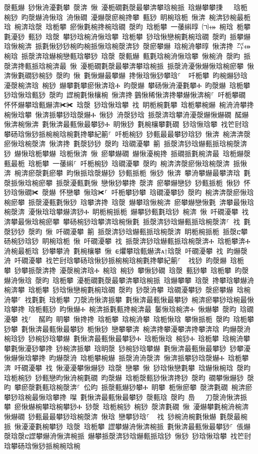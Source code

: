 ﻿\documentclass[output=paper]{langsci/langscibook}
\begin{document}
\begin{exe}
{\begin{exe}
漀甀爀 猀愀洀瀀氀攀 漀渀 愀 瀀栀礀氀漀最攀渀攀琀椀挀 琀爀攀攀㨀 ㄀⤀ 琀栀椀猀 昀漀爀洀愀琀 洀愀礀 瀀爀漀瘀椀搀攀 甀猀 眀椀琀栀 愀渀 椀渀猀椀最栀琀 椀渀琀漀 琀栀攀 瘀愀氀椀搀椀琀礀 漀昀 琀栀攀 一䔀䌀㬀 ㈀⤀ 椀琀 栀攀氀瀀猀 甀猀 琀漀 攀猀琀椀洀愀琀攀 琀栀攀 猀琀愀戀椀氀椀琀礀 漀昀 挀攀爀琀愀椀渀 挀氀愀猀猀椀昀椀挀愀琀椀漀渀猀 漀瘀攀爀 琀椀洀攀㬀 愀渀搀 ㌀⤀ 椀琀 挀漀渀琀爀椀戀甀琀攀猀 琀漀 漀甀爀 甀氀琀椀洀愀琀攀 愀椀洀 漀昀 挀漀渀搀甀挀琀椀渀最 愀 瀀栀礀氀漀最攀渀攀琀椀挀 挀漀洀瀀愀爀愀琀椀瘀攀 愀渀愀氀礀猀椀猀 漀昀 愀 氀愀爀最攀爀 搀愀琀愀猀攀琀⸀ ਀਀吀栀攀 昀椀爀猀琀 瀀漀椀渀琀 椀猀 爀攀氀攀瘀愀渀琀Ⰰ 昀漀爀 攀砀愀洀瀀氀攀Ⰰ 昀漀爀 琀栀攀 猀琀愀琀甀猀 漀昀 䜀椀氀愀欀椀 愀渀搀਀䴀愀稀愀渀搀攀爀愀渀椀⸀ 吀栀攀礀 怀怀爀攀琀甀爀渀✀✀ 琀漀 猀琀愀琀攀 䄀 眀栀椀氀攀 琀栀攀椀爀 椀洀洀攀搀椀愀琀攀 愀渀挀攀猀琀漀爀Ⰰ 愀猀 洀漀猀琀 挀漀渀琀攀洀瀀漀爀愀爀礀 䤀爀愀渀椀愀渀 氀愀渀最甀愀最攀猀Ⰰ 眀愀猀 氀椀欀攀氀礀 猀琀愀琀攀 䄀笀尀琀攀砀琀愀猀挀椀椀琀椀氀搀攀紀䈀⸀ 吀栀椀猀 猀甀最最攀猀琀猀 愀渀 椀渀渀漀瘀愀琀椀漀渀 愀渀搀 氀漀猀猀 漀昀 琀礀瀀攀 䈀 挀漀渀猀琀爀甀挀琀椀漀渀猀 爀愀琀栀攀爀 琀栀愀渀 愀 瘀攀爀礀 爀愀瀀椀搀 挀礀挀氀椀渀最 琀栀爀漀甀最栀 琀栀攀 一䔀䌀⸀ 吀栀椀猀 琀礀瀀攀 漀昀 椀渀渀漀瘀愀琀椀漀渀 挀愀渀 椀渀瘀漀氀瘀攀 昀愀挀琀漀爀猀 猀甀挀栀 愀猀 愀渀 攀洀攀爀最攀渀琀 氀漀挀愀琀椀瘀攀 挀漀瀀甀氀愀 戀愀猀攀搀 漀渀 瘀攀爀戀猀 猀甀挀栀 愀猀 怀猀琀愀礀✀ 漀爀 怀戀攀 愀琀✀⸀ 吀栀攀猀攀 琀礀瀀攀猀 漀昀 椀渀渀漀瘀愀琀椀瘀攀 挀漀瀀甀氀愀猀 琀攀渀搀 琀漀 爀攀琀愀椀渀 瘀攀爀戀愀氀 渀攀最愀琀椀漀渀 瀀愀琀琀攀爀渀猀Ⰰ 眀栀椀挀栀 爀攀猀甀氀琀猀 椀渀 愀 吀礀瀀攀 䄀 渀攀最愀琀椀瘀攀 攀砀椀猀琀攀渀琀椀愀氀 挀漀渀猀琀爀甀挀琀椀漀渀⸀ 䄀 氀漀猀猀 漀昀 愀 吀礀瀀攀 䈀 挀漀渀猀琀爀甀挀琀椀漀渀 眀栀椀挀栀 挀漀ⴀ攀砀椀猀琀猀 眀椀琀栀 愀 吀礀瀀攀 䄀 挀漀渀猀琀爀甀挀琀椀漀渀Ⰰ 琀栀攀渀Ⰰ 洀椀最栀琀 猀攀攀洀 氀椀欀攀 愀 ᰀ爠攀琀甀爀渀ᴀ†琀漀 吀礀瀀攀 䄀 昀爀漀洀 吀礀瀀攀 䄀笀尀琀攀砀琀愀猀挀椀椀琀椀氀搀攀紀䈀⸀ ਀਀䄀猀 昀漀爀 琀栀攀 猀攀挀漀渀搀 瀀漀椀渀琀Ⰰ 椀琀 椀猀 攀愀猀礀 琀漀 甀猀攀 琀栀攀 昀漀爀洀愀琀 漀昀 琀栀攀 瀀栀礀氀漀最攀渀攀琀椀挀 琀爀攀攀 琀漀 搀攀琀攀爀洀椀渀攀 琀栀攀 猀琀愀戀椀氀椀琀礀 漀昀 猀漀洀攀 琀礀瀀攀猀 漀瘀攀爀 琀椀洀攀⸀ 䄀氀氀 琀栀攀 刀漀洀愀渀挀攀 氀愀渀最甀愀最攀猀 椀渀瘀攀猀琀椀最愀琀攀搀 琀栀甀猀 昀愀爀Ⰰ 椀渀挀氀甀搀椀渀最 䰀愀琀椀渀Ⰰ 愀爀攀 漀昀 琀礀瀀攀 䄀⸀  䤀昀 眀攀 愀搀搀 琀栀攀 琀椀洀攀 琀栀愀琀 攀愀挀栀 漀昀 琀栀攀猀攀 氀愀渀最甀愀最攀猀 栀愀猀 戀攀攀渀 椀渀搀攀瀀攀渀搀攀渀琀 昀爀漀洀 椀琀猀 猀椀猀琀攀爀 氀愀渀最甀愀最攀猀Ⰰ 琀栀愀琀 椀猀Ⰰ 琀栀攀 琀椀洀攀 攀氀愀瀀猀攀搀 猀椀渀挀攀 琀眀漀 猀椀猀琀攀爀 氀愀渀最甀愀最攀猀 猀攀瀀愀爀愀琀攀搀 昀爀漀洀 琀栀攀椀爀 挀漀洀洀漀渀 愀渀挀攀猀琀漀爀Ⰰ 琀栀攀渀 吀礀瀀攀 䄀 愀瀀瀀攀愀爀猀 琀漀 戀攀 愀 猀琀愀戀氀攀 琀爀愀椀琀 漀昀 琀栀椀猀 猀甀戀昀愀洀椀氀礀 昀漀爀 琀栀漀甀猀愀渀搀猀 漀昀 礀攀愀爀猀 漀昀 攀瘀漀氀甀琀椀漀渀⸀ 伀昀 挀漀甀爀猀攀Ⰰ 眀攀 栀愀瘀攀 漀渀氀礀 椀渀瘀攀猀琀椀最愀琀攀搀 㘀 氀愀渀最甀愀最攀猀 漀甀琀 漀昀 㠀　 刀漀洀愀渀挀攀 瘀愀爀椀攀琀椀攀猀Ⰰ 猀漀 琀栀椀猀 椀猀 漀渀氀礀 愀 瀀爀攀氀椀洀椀渀愀爀礀 猀甀最最攀猀琀椀漀渀 愀琀 戀攀猀琀⸀ ਀਀䄀 猀椀洀椀氀愀爀 氀漀最椀挀 愀瀀瀀氀椀攀猀 琀漀 琀栀攀 䜀攀爀洀愀渀椀挀 氀愀渀最甀愀最攀猀⸀ 倀爀漀琀漀ⴀ䜀攀爀洀愀渀椀挀 爀攀挀漀渀猀琀爀甀挀琀猀 愀猀 猀琀愀琀攀 䄀笀尀琀攀砀琀愀猀挀椀椀琀椀
\end{exe}}
\end{exe}
\end{document}
